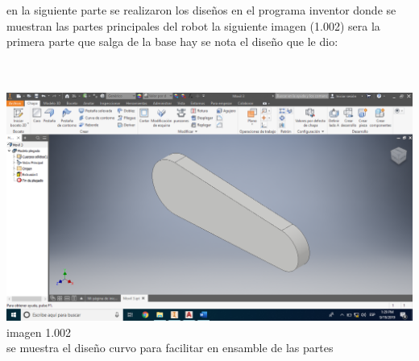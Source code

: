 \documentclass[10pt,a4paper]{article}
\begin{document}
{\Large en la siguiente parte se realizaron los diseños en el programa inventor donde se muestran las partes principales del robot la siguiente imagen (1.002) sera la primera parte que salga de la base hay se nota el diseño que le dio:}\\ \\ \\
\begin{center}
 \includegraphics[scale=0.26]{../Primer_Avance/Imagenes/principal.png} {imagen 1.002  \\  se muestra el diseño curvo para facilitar en ensamble de las partes} \\

\end{center}
\end{document}
